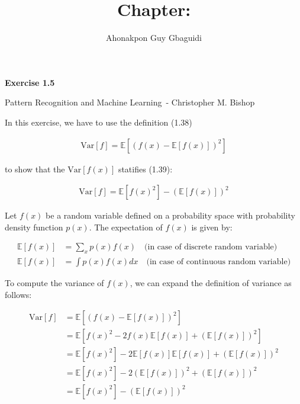 \documentclass{article}
\title{Chapter: \ChapterName}
\author{Ahonakpon Guy Gbaguidi}
\date{}
\newcommand{\BookName}{Pattern Recognition and Machine Learning}
\newcommand{\BookAuthor}{Christopher M. Bishop}
\newcommand{\ExerciseID}{1.5}
\begin{document}
\maketitle

\begin{center}
  \large\textbf{Exercise \ExerciseID}

  \vspace{0.5em}

  \normalsize\BookName\ - \BookAuthor
\end{center}

\begin{tcolorbox}[breakable,colback=gray!5,colframe=gray!60,title=Solution]
In this exercise, we have to use the definition (1.38)

\begin{align*}
  \text{Var}[f] = \mathbb{E} \left[ \left( f(x) - \mathbb{E}[f(x)] \right)^2 \right]
\end{align*}

to show that the $\text{Var}[f(x)]$ statifies (1.39):

\begin{align*}
  \text{Var}[f] = \mathbb{E}[f(x)^2] - \left( \mathbb{E}[f(x)] \right)^2
\end{align*}

Let $f(x)$ be a random variable defined on a probability space with probability density function $p(x)$. The expectation of $f(x)$ is given by:

\begin{align*}
  \mathbb{E}[f(x)] &= \sum_x p(x) f(x) \quad \text{(in case of discrete random variable)} \\
  \mathbb{E}[f(x)] &= \int p(x) f(x) dx \quad \text{(in case of continuous random variable)}
\end{align*}

To compute the variance of $f(x)$, we can expand the definition of variance as follows:

\begin{align*}
  \text{Var}[f] &= \mathbb{E} \left[ \left( f(x) - \mathbb{E}[f(x)] \right)^2 \right] \\
  &= \mathbb{E} \left[ f(x)^2 - 2 f(x) \mathbb{E}[f(x)] + \left( \mathbb{E}[f(x)] \right)^2 \right] \\
  &= \mathbb{E}[f(x)^2] - 2 \mathbb{E}[f(x)] \mathbb{E}[f(x)] + \left( \mathbb{E}[f(x)] \right)^2 \\
  &= \mathbb{E}[f(x)^2] - 2 \left( \mathbb{E}[f(x)] \right)^2 + \left( \mathbb{E}[f(x)] \right)^2 \\
  &= \mathbb{E}[f(x)^2] - \left( \mathbb{E}[f(x)] \right)^2
\end{align*}


\end{tcolorbox}
\end{document}
